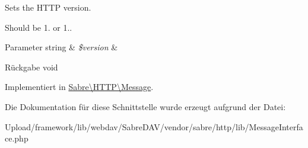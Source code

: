 Sets the H\+T\+TP version.

Should be 1. or 1..


\begin{DoxyParams}[1]{Parameter}
string & {\em \$version} & \\
\hline
\end{DoxyParams}
\begin{DoxyReturn}{Rückgabe}
void 
\end{DoxyReturn}


Implementiert in \mbox{\hyperlink{class_sabre_1_1_h_t_t_p_1_1_message_a92fc3c197a8d7c713c7ccafc61989147}{Sabre\textbackslash{}\+H\+T\+T\+P\textbackslash{}\+Message}}.



Die Dokumentation für diese Schnittstelle wurde erzeugt aufgrund der Datei\+:\begin{DoxyCompactItemize}
\item 
Upload/framework/lib/webdav/\+Sabre\+D\+A\+V/vendor/sabre/http/lib/Message\+Interface.\+php\end{DoxyCompactItemize}
